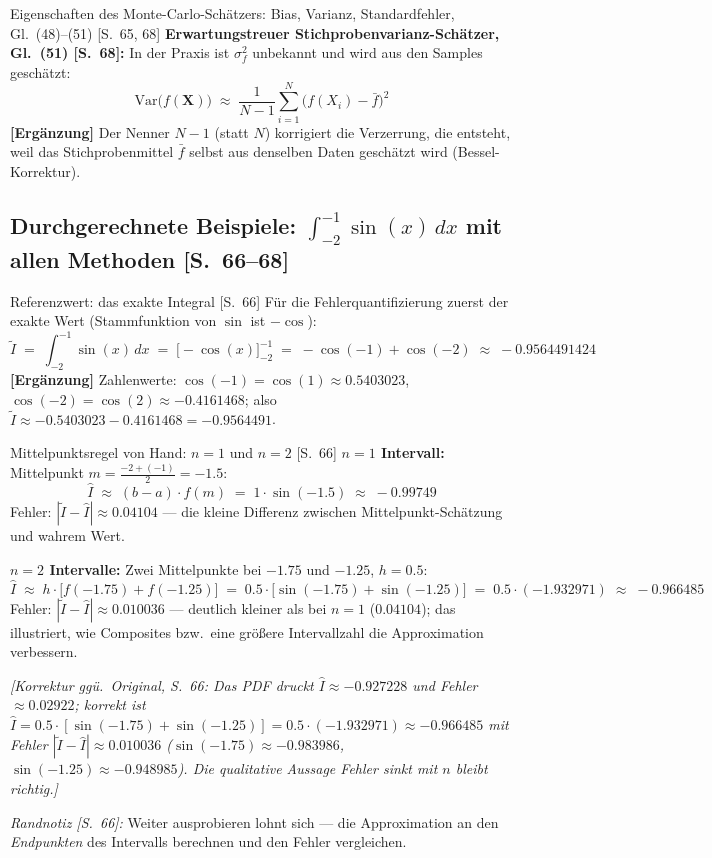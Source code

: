 \begin{satzbox}{Eigenschaften des Monte-Carlo-Schätzers: Bias, Varianz, Standardfehler, Gl.~(48)--(51) [S.~65, 68]}
\medskip
\textbf{Erwartungstreuer Stichprobenvarianz-Schätzer, Gl.~(51) [S.~68]:} In der
Praxis ist $\sigma_f^2$ unbekannt und wird aus den Samples geschätzt:
\[
  \mathrm{Var}\bigl(f(\mathbf{X})\bigr) \;\approx\; \frac{1}{N-1}\sum_{i=1}^{N}\bigl(f(X_i) - \bar{f}\bigr)^2 \tag{51}
\]
\textbf{[Ergänzung]} Der Nenner $N-1$ (statt $N$) korrigiert die Verzerrung, die
entsteht, weil das Stichprobenmittel $\bar{f}$ selbst aus denselben Daten geschätzt
wird (Bessel-Korrektur).
\end{satzbox}

\subsection{Durchgerechnete Beispiele: $\int_{-2}^{-1}\sin(x)\,dx$ mit allen Methoden [S.~66--68]}

\begin{bspbox}{Referenzwert: das exakte Integral [S.~66]}
Für die Fehlerquantifizierung zuerst der exakte Wert (Stammfunktion von $\sin$ ist
$-\cos$):
\[
  \tilde{I} \;=\; \int_{-2}^{-1} \sin(x)\,dx \;=\; \bigl[-\cos(x)\bigr]_{-2}^{-1}
  \;=\; -\cos(-1) + \cos(-2) \;\approx\; -0.9564491424
\]
\textbf{[Ergänzung]} Zahlenwerte: $\cos(-1) = \cos(1) \approx 0.5403023$,
$\cos(-2) = \cos(2) \approx -0.4161468$; also
$\tilde{I} \approx -0.5403023 - 0.4161468 = -0.9564491$.
\end{bspbox}

\begin{bspbox}{Mittelpunktsregel von Hand: $n = 1$ und $n = 2$ [S.~66]}
\textbf{$n = 1$ Intervall:} Mittelpunkt $m = \frac{-2 + (-1)}{2} = -1.5$:
\[
  \hat{I} \;\approx\; (b - a)\cdot f(m) \;=\; 1 \cdot \sin(-1.5) \;\approx\; -0.99749
\]
Fehler: $|\tilde{I} - \hat{I}| \approx 0.04104$ --- die kleine Differenz zwischen
Mittelpunkt-Schätzung und wahrem Wert.

\medskip
\textbf{$n = 2$ Intervalle:} Zwei Mittelpunkte bei $-1.75$ und $-1.25$, $h = 0.5$:
\[
  \hat{I} \;\approx\; h\cdot\bigl[f(-1.75) + f(-1.25)\bigr]
  \;=\; 0.5\cdot\bigl[\sin(-1.75) + \sin(-1.25)\bigr]
  \;=\; 0.5 \cdot (-1.932971) \;\approx\; -0.966485
\]
Fehler: $|\tilde{I} - \hat{I}| \approx 0.010036$ --- deutlich kleiner als bei $n = 1$
($0.04104$); das illustriert, wie Composites bzw.\ eine grö{\ss}ere Intervallzahl die
Approximation verbessern.

\emph{[Korrektur ggü.\ Original, S.~66: Das PDF druckt \glqq$\hat{I} \approx
-0.927228$\grqq{} und Fehler \glqq$\approx 0.02922$\grqq; korrekt ist
$\hat{I} = 0.5\cdot[\sin(-1.75) + \sin(-1.25)] = 0.5\cdot(-1.932971) \approx
-0.966485$ mit Fehler $|\tilde{I} - \hat{I}| \approx 0.010036$
($\sin(-1.75) \approx -0.983986$, $\sin(-1.25) \approx -0.948985$). Die qualitative
Aussage \glqq Fehler sinkt mit $n$\grqq{} bleibt richtig.]}

\medskip
\emph{Randnotiz [S.~66]:} Weiter ausprobieren lohnt sich --- die Approximation an den
\emph{Endpunkten} des Intervalls berechnen und den Fehler vergleichen.
\end{bspbox}

